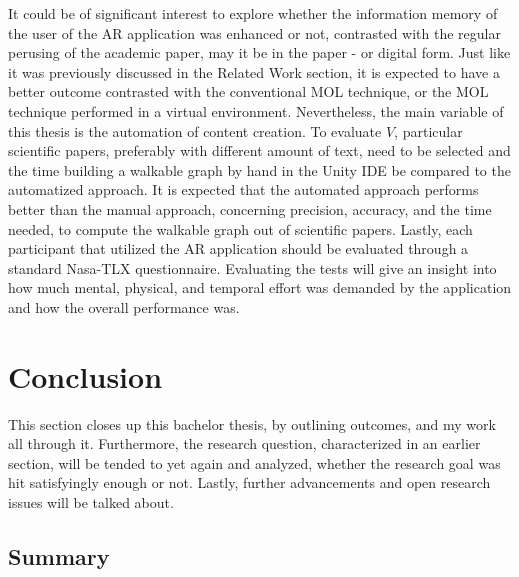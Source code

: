 \documentclass[12pt,a4paper,oneside,american,parskip=half]{article}
\begin{document}
\begin{justify}
\begin{normalsize}
It could be of significant interest to explore whether the information memory of the user of the AR application was enhanced or not, contrasted with the regular perusing of the academic paper, may it be in the paper - or digital form. Just like it was previously discussed in the Related Work section, it is expected to have a better outcome contrasted with the conventional MOL technique, or the MOL technique performed in a virtual environment.
\newline
\newline
Nevertheless, the main variable of this thesis is the automation of content creation.
To evaluate $V$, particular scientific papers, preferably with different amount of text, need to be selected and the time building a walkable graph by hand in the Unity IDE be compared to the automatized approach. It is expected that the automated approach performs better than the manual approach, concerning precision, accuracy, and the time needed, to compute the walkable graph out of scientific papers.
\newline
Lastly, each participant that utilized the AR application should be evaluated through a standard Nasa-TLX questionnaire. Evaluating the tests will give an insight into how much mental, physical, and temporal effort was demanded by the application and how the overall performance was.

\clearpage
\section{Conclusion}

This section closes up this bachelor thesis, by outlining outcomes, and my work all through it. Furthermore, the research question, charac­terized in an earlier section, will be tended to yet again and analyzed, whether the
research goal was hit satisfyingly enough or not. Lastly, further advancements
and open research issues will be talked about.

\subsection{Summary}


\end{normalsize}
\end{justify}
\end{document}
